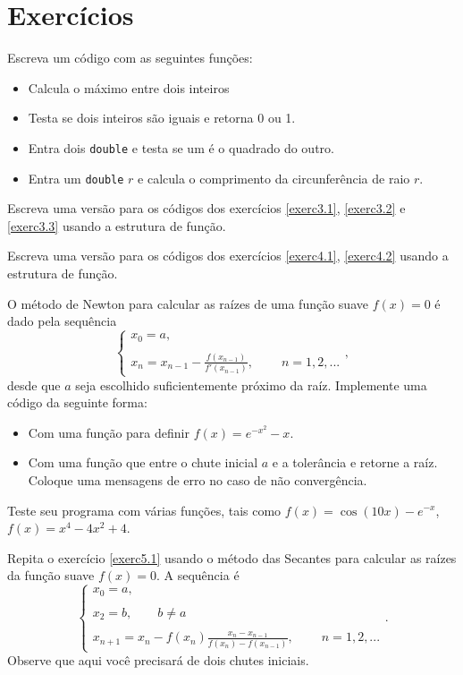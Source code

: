 \section{Exercícios}
\begin{exer}
Escreva um código com as seguintes funções:
\begin{itemize}
 \item Calcula o máximo entre dois inteiros
 \item Testa se dois inteiros são iguais e retorna 0 ou 1.
 \item Entra dois \verb|double| e testa se um é o quadrado do outro.
 \item Entra um \verb|double| $r$ e calcula o comprimento da circunferência de raio $r$.
\end{itemize}

\end{exer}
\begin{exer}Escreva uma versão para os códigos dos exercícios \ref{exerc3.1}, \ref{exerc3.2} e \ref{exerc3.3} usando a estrutura de função.
\end{exer}
\begin{exer}Escreva uma versão para os códigos dos exercícios \ref{exerc4.1}, \ref{exerc4.2} usando a estrutura de função.
\end{exer}
\begin{exer}\label{exerc5.1}O método de Newton para calcular as raízes de uma função suave $f(x)=0$ é dado pela sequência
$$\left\{
\begin{array}{l}\displaystyle
 x_0=a,\\\\ \displaystyle
 x_{n}=x_{n-1}-\frac{f(x_{n-1})}{f'(x_{n-1})},\qquad \ n=1,2,...
\end{array}\right.,
$$
desde que $a$ seja escolhido suficientemente próximo da raíz. Implemente uma código da seguinte forma:
\begin{itemize} 
 \item Com uma função para definir $f(x)=e^{-x^2}-x$.
 \item Com uma função que entre o chute inicial $a$ e a tolerância e retorne a raíz. Coloque uma mensagens de erro no caso de não convergência.
\end{itemize}
Teste seu programa com várias funções, tais como $f(x)=\cos(10x)-e^{-x}$, $f(x)=x^4-4x^2+4$.
\end{exer}
\begin{exer}\label{exerc5.1.1}Repita o exercício \ref{exerc5.1} usando o método das Secantes para calcular as raízes da função suave $f(x)=0$. A sequência é
$$\left\{
\begin{array}{l}\displaystyle
 x_0=a,\\\\ \displaystyle
 x_2=b,\qquad b\neq a\\\\ \displaystyle
 x_{n+1}=x_{n}-f(x_n)\frac{x_{n}-x_{n-1}}{f(x_n)-f(x_{n-1})},\qquad \ n=1,2,...
\end{array}\right..
$$
Observe que aqui você precisará de dois chutes iniciais.
\end{exer}

